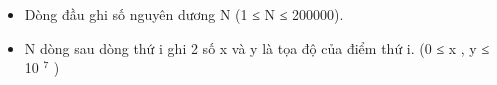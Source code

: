 \begin{itemize}
	\item Dòng đầu ghi số nguyên dương N (1 ≤ N ≤ 200000).
	\item N dòng sau dòng thứ i ghi 2 số x và y là tọa độ của điểm thứ i. (0 ≤ x , y ≤ 10 $^ 7 $ )
\end{itemize}

\